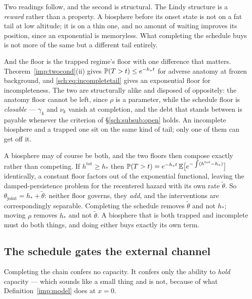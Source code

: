Two readings follow, and the second is structural. The Lindy structure is a \emph{reward} rather than a property. A
biosphere before its onset state is not on a fat tail at low altitude;
it is on a thin one, and no amount of waiting improves its position,
since an exponential is memoryless. What completing the schedule buys is
not more of the same but a different tail entirely.

And the floor is the trapped regime's floor with one difference that
matters. Theorem~\ref{imp:twocond}(ii) gives $\mathbb{P}(T>t)\le e^{-h_\ast t}$
for adverse anatomy at frozen background, and \eqref{sch:eq:incompletetail}
gives an
exponential floor for incompleteness. The two are structurally alike and
disposed of oppositely: the anatomy floor cannot be left, since $\rho$ is
a parameter, while the schedule floor is \emph{closable} --- $\gamma_k$
and $\nu_k$ vanish at completion, and the debt that stands between is
payable whenever the criterion of \S\ref{sch:subsub:open} holds. An
incomplete biosphere and a trapped one sit on the same kind of tail; only
one of them can get off it.

A biosphere may of course be both, and the two floors then compose
exactly rather than competing. If $h^{\mathrm{tot}}\ge h_\ast$ then
$\mathbb{P}(T>t)=e^{-h_\ast t}\,\mathbb{E}\bigl[e^{-\int(h^{\mathrm{tot}}-h_\ast)}\bigr]$
identically, a constant floor factors out of the exponential
functional, leaving the damped-persistence problem for the recentered
hazard with its own rate $\tilde\theta$. So
$\theta_{\mathrm{joint}}=h_\ast+\tilde\theta$: neither floor governs, they
\emph{add}, and the interventions are correspondingly separable.
Completing the schedule removes $\tilde\theta$ and not $h_\ast$; moving
$\rho$ removes $h_\ast$ and not $\tilde\theta$. A biosphere that is both
trapped and incomplete must do both things, and doing either buys exactly
its own term.

\subsection{The schedule gates the external channel}
\label{sch:subsub:gating}

Completing the chain confers no capacity. It confers only the ability to
\emph{hold} capacity --- which sounds like a small thing and is not,
because of what Definition~\ref{imp:model} does at $x=0$.

